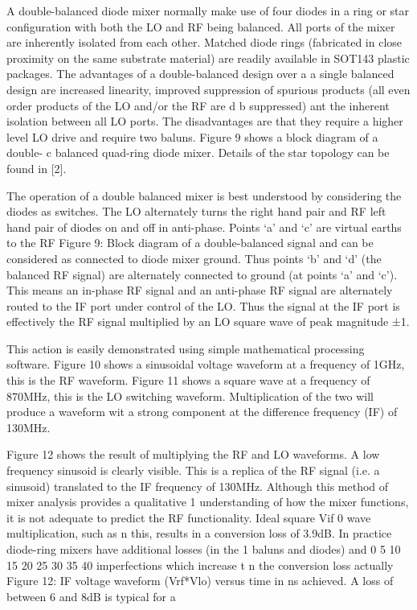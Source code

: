 \documentclass[a4paper,10pt]{article}
\begin{document}
	A double-balanced diode mixer normally make use of four diodes in a ring or star configuration with both the
	LO and RF being balanced. All ports of the mixer are inherently isolated from each other. Matched diode rings
	(fabricated in close proximity on the same substrate material) are readily available in SOT143 plastic packages.
	The advantages of a double-balanced design over a
	a
	single balanced design are increased linearity,
	improved suppression of spurious products (all
	even order products of the LO and/or the RF are
	d
	b
	suppressed) ant the inherent isolation between all
	LO
	ports. The disadvantages are that they require a
	higher level LO drive and require two baluns.
	Figure 9 shows a block diagram of a double-
	c
	balanced quad-ring diode mixer. Details of the star
	topology can be found in [2].

The operation of a double balanced mixer is best
understood by considering the diodes as switches.
The LO alternately turns the right hand pair and
RF
left hand pair of diodes on and off in anti-phase.
Points ‘a’ and ‘c’ are virtual earths to the RF
Figure 9: Block diagram of a double-balanced
signal and can be considered as connected to
diode mixer
ground. Thus points ‘b’ and ‘d’ (the balanced RF
signal) are alternately connected to ground (at
points ‘a’ and ‘c’). This means an in-phase RF signal and an anti-phase RF signal are alternately routed to the
IF port under control of the LO. Thus the signal at the IF port is effectively the RF signal multiplied by an LO
square wave of peak magnitude ±1.


This action is easily demonstrated using simple mathematical processing software. Figure 10 shows a sinusoidal
voltage waveform at a frequency of 1GHz, this is the RF waveform. Figure 11 shows a square wave at a
frequency of 870MHz, this is the LO switching waveform. Multiplication of the two will produce a waveform
wit a strong component at the difference frequency (IF) of 130MHz.

Figure 12 shows the result of multiplying the RF and LO waveforms. A low frequency sinusoid is clearly
visible. This is a replica of the RF signal (i.e. a sinusoid) translated to the IF frequency of 130MHz. Although
this method of mixer analysis
provides
a
qualitative
1
understanding of how the
mixer functions, it is not
adequate to predict the RF
functionality. Ideal square
Vif 0
wave multiplication, such as
n
this, results in a conversion
loss of 3.9dB. In practice
diode-ring
mixers
have
additional losses (in the
1
baluns and diodes) and
0
5
10
15
20
25
30
35
40
imperfections which increase
t
n
the conversion loss actually
Figure 12: IF voltage waveform (Vrf*Vlo) versus time in ns
achieved. A loss of between
6 and 8dB is typical for a
\end{document}
